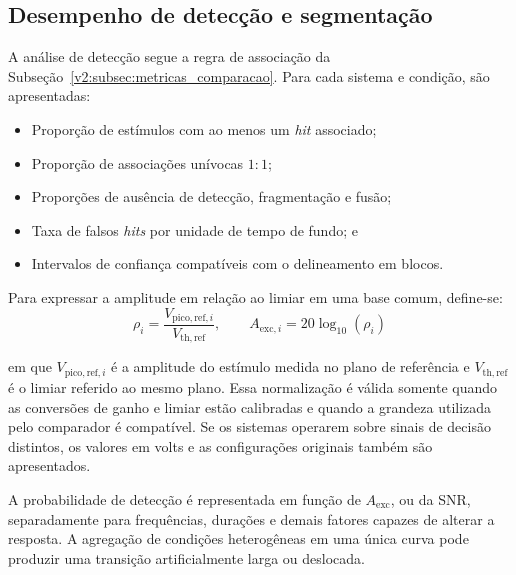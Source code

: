 \subsection{Desempenho de detecção e segmentação}
\label{v2:subsec:concordancia_deteccao_resultados}

A análise de detecção segue a regra de associação da Subseção~\ref{v2:subsec:metricas_comparacao}. Para cada sistema e condição, são apresentadas:
\begin{itemize}
	\item Proporção de estímulos com ao menos um \textit{hit} associado;
	
	\item Proporção de associações unívocas \(1{:}1\);
	
	\item Proporções de ausência de detecção, fragmentação e fusão;
	
	\item Taxa de falsos \textit{hits} por unidade de tempo de fundo; e
	
	\item Intervalos de confiança compatíveis com o delineamento em blocos.
\end{itemize}

Para expressar a amplitude em relação ao limiar em uma base comum, define-se:
\begin{equation}
	\rho_i = \frac{V_{\mathrm{pico,ref},i}}{V_{\mathrm{th,ref}}}, \qquad A_{\mathrm{exc},i} = 20\log_{10}\left(\rho_i\right)
	\label{v2:eq:amplitude_relativa_limiar_resultados}
\end{equation}

\noindent
em que \(V_{\mathrm{pico,ref},i}\) é a amplitude do estímulo medida no plano de referência e \(V_{\mathrm{th,ref}}\) é o limiar referido ao mesmo plano. Essa normalização é válida somente quando as conversões de ganho e limiar estão calibradas e quando a grandeza utilizada pelo comparador é compatível. Se os sistemas operarem sobre sinais de decisão distintos, os valores em volts e as configurações originais também são apresentados.

A probabilidade de detecção é representada em função de \(A_{\mathrm{exc}}\), ou da SNR, separadamente para frequências, durações e demais fatores capazes de alterar a resposta. A agregação de condições heterogêneas em uma única curva pode produzir uma transição artificialmente larga ou deslocada.

